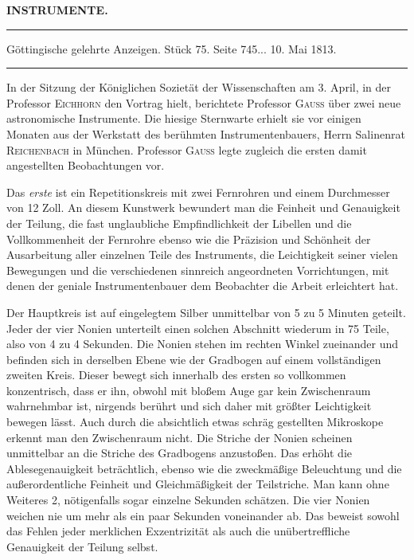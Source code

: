 \clearpage{}\hypertarget{native-370-lower}{}\label{native-370-lower}
\begin{center}\textbf{INSTRUMENTE.}\par\vspace{4pt}\hrule\vspace{4pt}\fontsize{10}{12}\selectfont Göttingische gelehrte Anzeigen. Stück 75. Seite 745\;... 10. Mai 1813.\par\vspace{4pt}\hrule\vspace{4pt}\end{center}

\par\indent In der Sitzung der Königlichen Sozietät der Wissenschaften am 3. April, in der Professor \textsc{Eichhorn} den Vortrag hielt, berichtete Professor \textsc{Gauss} über zwei neue astronomische Instrumente. Die hiesige Sternwarte erhielt sie vor einigen Monaten aus der Werkstatt des berühmten Instrumentenbauers, Herrn Salinenrat \textsc{Reichenbach} in München. Professor \textsc{Gauss} legte zugleich die ersten damit angestellten Beobachtungen vor.

\par\indent Das \emph{erste} ist ein Repetitionskreis mit zwei Fernrohren und einem Durchmesser von 12 Zoll. An diesem Kunstwerk bewundert man die Feinheit und Genauigkeit der Teilung, die fast unglaubliche Empfindlichkeit der Libellen und die Vollkommenheit der Fernrohre ebenso wie die Präzision und Schönheit der Ausarbeitung aller einzelnen Teile des Instruments, die Leichtigkeit seiner vielen Bewegungen und die verschiedenen sinnreich angeordneten Vorrichtungen, mit denen der geniale Instrumentenbauer dem Beobachter die Arbeit erleichtert hat.

\par\indent Der Hauptkreis ist auf eingelegtem Silber unmittelbar von 5 zu 5 Minuten geteilt. Jeder der vier Nonien unterteilt einen solchen Abschnitt wiederum in 75 Teile, also von 4 zu 4 Sekunden. Die Nonien stehen im rechten Winkel zueinander und befinden sich in derselben Ebene wie der Gradbogen auf einem vollständigen zweiten Kreis. Dieser bewegt sich innerhalb des ersten so vollkommen konzentrisch, dass er ihn, obwohl mit bloßem Auge gar kein Zwischenraum wahrnehmbar ist, nirgends berührt und sich daher mit größter Leichtigkeit bewegen lässt. Auch durch die absichtlich etwas schräg gestellten Mikroskope erkennt man den Zwischenraum nicht. Die Striche der Nonien scheinen unmittelbar an die Striche des Gradbogens anzustoßen. Das erhöht die Ablesegenauigkeit beträchtlich, ebenso wie die zweckmäßige Beleuchtung und die außerordentliche Feinheit und Gleichmäßigkeit der Teilstriche. Man kann ohne Weiteres 2, nötigenfalls sogar einzelne Sekunden schätzen. Die vier Nonien weichen nie um mehr als ein paar Sekunden voneinander ab. Das beweist sowohl das Fehlen jeder merklichen Exzentrizität als auch die unübertreffliche Genauigkeit der Teilung selbst.

